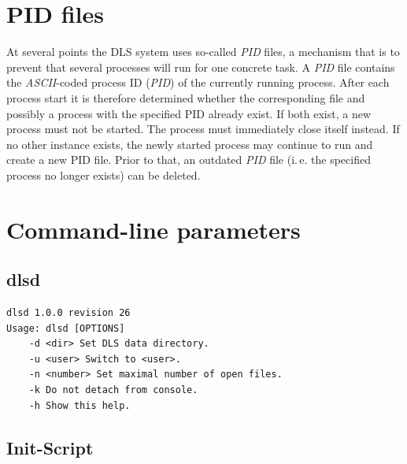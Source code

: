 \documentclass[a4paper,12pt,BCOR6mm,bibtotoc,idxtotoc]{scrbook}
\begin{document}

\chapter{PID files} \label{sec:apx_pid}

At several points the DLS system uses so-called \textit{PID} files, a mechanism that is to prevent that several processes will run for one
concrete task. A \textit{PID} file contains the \textit{ASCII}-coded process ID
(\textit{PID}) of the currently running process. After each process start it
is therefore determined whether the corresponding file and possibly a process
with the specified PID already exist. If both exist, a new process must not be
started. The process must immediately close itself instead. If no other
instance exists, the newly started process may continue to run and create a
new PID file. Prior to that, an outdated \textit{PID} file (i.\,e. the
specified process no longer exists) can be deleted.


\chapter{Command-line parameters}


\section{dlsd}

\begin{lstlisting}
dlsd 1.0.0 revision 26
Usage: dlsd [OPTIONS]
    -d <dir> Set DLS data directory.
    -u <user> Switch to <user>.
    -n <number> Set maximal number of open files.
    -k Do not detach from console.
    -h Show this help.
\end{lstlisting}


\section{Init-Script}
\end{document}
